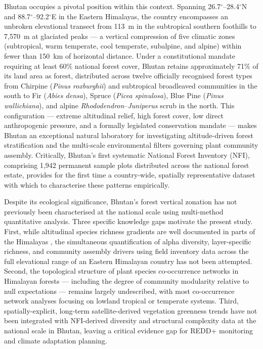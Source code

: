 \documentclass[review,12pt,a4paper]{elsarticle}
\begin{document}
Bhutan occupies a pivotal position within this context. Spanning
26.7$^\circ$--28.4$^\circ$N and 88.7$^\circ$--92.2$^\circ$E in the
Eastern Himalayas, the country encompasses an unbroken elevational transect
from 113~m in the subtropical southern foothills to 7{,}570~m at glaciated
peaks --- a vertical compression of five climatic zones (subtropical, warm
temperate, cool temperate, subalpine, and alpine) within fewer than 150~km
of horizontal distance. Under a constitutional mandate requiring at least
60\% national forest cover, Bhutan retains approximately 71\% of its land
area as forest, distributed across twelve officially recognised forest types
from Chirpine (\textit{Pinus roxburghii}) and subtropical broadleaved
communities in the south to Fir (\textit{Abies densa}), Spruce
(\textit{Picea spinulosa}), Blue Pine (\textit{Pinus wallichiana}), and
alpine \textit{Rhododendron}--\textit{Juniperus} scrub in the north. This
configuration --- extreme altitudinal relief, high forest cover, low direct
anthropogenic pressure, and a formally legislated conservation mandate ---
makes Bhutan an exceptional natural laboratory for investigating
altitude-driven forest stratification and the multi-scale environmental
filters governing plant community assembly. Critically, Bhutan's first
systematic National Forest Inventory (NFI), comprising 1{,}942 permanent
sample plots distributed across the national forest estate, provides for the
first time a country-wide, spatially representative dataset with which to
characterise these patterns empirically.

Despite its ecological significance, Bhutan's forest vertical zonation has
not previously been characterised at the national scale using multi-method
quantitative analysis. Three specific knowledge gaps motivate the present
study. First, while altitudinal species richness gradients are well documented
in parts of the Himalayas \citep{grytnes2002}, the simultaneous quantification
of alpha diversity, layer-specific richness, and community assembly drivers
using field inventory data across the full elevational range of an Eastern
Himalayan country has not been attempted. Second, the topological structure of
plant species co-occurrence networks in Himalayan forests --- including the
degree of community modularity relative to null expectations --- remains
largely undescribed, with most co-occurrence network analyses focusing on
lowland tropical or temperate systems. Third, spatially-explicit, long-term
satellite-derived vegetation greenness trends have not been integrated with
NFI-derived diversity and structural complexity data at the national scale in
Bhutan, leaving a critical evidence gap for REDD+ monitoring and climate
adaptation planning.
\end{document}
